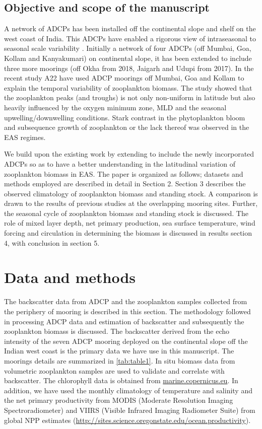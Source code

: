\documentclass{article}
\begin{document}
	\subsection{Objective and scope of the manuscript}
	
	A network of ADCPs has been installed off the continental slope and shelf on the west coast of India. This ADCPs have enabled a rigorous view of intraseasonal to seasonal scale variability \citep{amol2014observed, chaudhuri2020observed}. Initially a network of four ADCPs (off Mumbai, Goa, Kollam and Kanyakumari) on continental slope, it has been extended to include three more moorings (off Okha from 2018, Jaigarh and Udupi from 2017). In the recent study A22 have used ADCP moorings off  Mumbai, Goa and Kollam to explain the temporal variability of zooplankton biomass. The study showed that the zooplankton peaks (and troughs) is not only non-uniform in latitude but also heavily influenced by the oxygen minimum zone, MLD and the seasonal upwelling/downwelling conditions. Stark contrast in the phytoplankton bloom and subsequence  growth of zooplankton or the lack thereof was observed in the EAS regimes.


	We build upon the existing work by extending to include the newly incorporated ADCPs so as to have a better understanding in the latitudinal variation of zooplankton biomass in EAS. The paper is organized as follows; datasets and methods employed are described in detail in Section 2. Section 3 describes the observed climatology of zooplankton biomass and standing stock. A comparison is drawn to the results of previous studies at the overlapping mooring sites. Further, the seasonal cycle of zooplankton biomass and standing stock is discussed. The role of mixed layer depth, net primary production, sea surface temperature, wind forcing and circulation in determining the biomass is discussed in results section 4, with conclusion in section 5.
	
	\section{Data and methods}
	The  backscatter data from ADCP and the zooplankton samples collected from the periphery of mooring is described in this section. The methodology followed in processing ADCP data and estimation of backscatter and subsequently the zooplankton biomass is discussed. The backscatter derived from the echo intensity of the seven ADCP mooring deployed on the continental slope off the Indian west coast is the primary data we have use in this manuscript. The moorings details are summarized in \autoref{tab:table1}. In situ biomass data from volumetric zooplankton samples are used to validate and correlate with backscatter. The chlorophyll data is obtained from \href{https://data.marine.copernicus.eu/products}{marine.copernicus.eu}. In addition, we have used the monthly climatology of temperature and salinity \citep{chatterjee2012new} and the net primary productivity from MODIS (Moderate Resolution Imaging Spectroradiometer) and VIIRS (Visible Infrared Imaging Radiometer Suite) from global NPP estimates (\href{http://sites.science.oregonstate.edu/ocean.productivity}{http://sites.science.oregonstate.edu/ocean.productivity}). 
	
\end{document}
